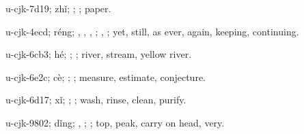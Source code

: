 \begin{multicols}{2}
{\cjkgGlue{}u-cjk-7d19; zhǐ; \cjkgGlue{}; \cjkgGlue{}; paper.

\cjkgGlue{}u-cjk-4ecd; réng; \cjkgGlue{}\cjkgGlue{}\cjkgGlue{}, \cjkgGlue{}, \cjkgGlue{}, \cjkgGlue{}; \cjkgGlue{}, \cjkgGlue{}; yet, still, as ever, again, keeping, continuing.

\cjkgGlue{}u-cjk-6cb3; hé; \cjkgGlue{}; \cjkgGlue{}; river, stream, yellow river.

\cjkgGlue{}u-cjk-6e2c; cè; \cjkgGlue{}\cjkgGlue{}\cjkgGlue{}; \cjkgGlue{}; measure, estimate, conjecture.

\cjkgGlue{}u-cjk-6d17; xǐ; \cjkgGlue{}\cjkgGlue{}\cjkgGlue{}; \cjkgGlue{}; wash, rinse, clean, purify.

\cjkgGlue{}u-cjk-9802; dǐng; \cjkgGlue{}\cjkgGlue{}\cjkgGlue{}, \cjkgGlue{}; \cjkgGlue{}; top, peak, carry on head, very.

}
\end{multicols}
